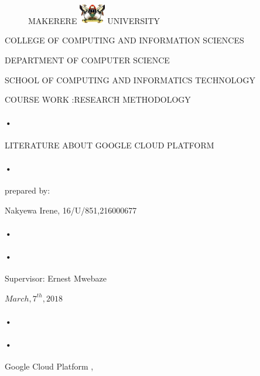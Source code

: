 \documentclass[10pt,]{article}
\begin{document}
\begin{titlepage}
\begin{figure}[h]
  \centerline{\small MAKERERE 
  \includegraphics[width=0.1\textwidth]  {muk_log} UNIVERSITY}
\end{figure}
\centerline{COLLEGE OF COMPUTING AND INFORMATION SCIENCES\\}
\centerline{DEPARTMENT OF COMPUTER SCIENCE\\}
\centerline{SCHOOL OF COMPUTING AND INFORMATICS TECHNOLOGY\\}
\centerline{COURSE WORK :RESEARCH METHODOLOGY\\}
\paragraph*{•}
\centerline{LITERATURE ABOUT GOOGLE CLOUD PLATFORM\\}
\paragraph*{•}
\centerline{prepared by:\\}
\centerline{Nakyewa Irene, 16/U/851,216000677\\}
\paragraph*{•}


\paragraph*{•}
\centerline{Supervisor: Ernest Mwebaze\\}
\centerline{ $March,7^{th},2018$\\}


\paragraph*{•}
\paragraph*{•}
  \begin{flushright}
 Google Cloud Platform ,\\
 
 \tableofcontents

  \end{flushright}
\date{\today}
\end{titlepage}
\end{document}
